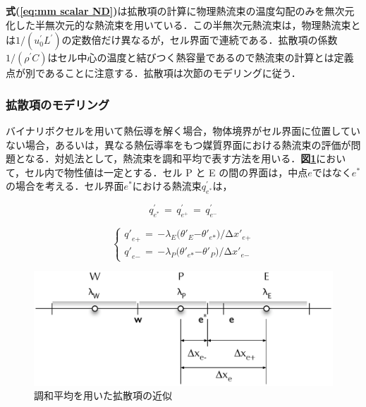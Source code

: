 \textbf{式(\ref{eq:mm scalar ND})}は拡散項の計算に物理熱流束の温度勾配のみを無次元化した半無次元的な熱流束を用いている．この半無次元熱流束は，物理熱流束とは$1/(u_{0}^{\prime}L^{\prime})$の定数倍だけ異なるが，セル界面で連続である．拡散項の係数$1/({\rho}^{\prime}C)$はセル中心の温度と結びつく熱容量であるので熱流束の計算とは定義点が別であることに注意する．拡散項は次節のモデリングに従う．

%
\subsubsection{拡散項のモデリング}
バイナリボクセルを用いて熱伝導を解く場合，物体境界がセル界面に位置していない場合，あるいは，異なる熱伝導率をもつ媒質界面における熱流束の評価が問題となる．対処法として，熱流束を調和平均で表す方法を用いる\cite{pat:80}．\textbf{図\ref{fig:diffusive flux}}において，セル内で物性値は一定とする．セル P と E の間の界面は，中点$e$ではなく$e^*$の場合を考える．セル界面$e^*$における熱流束$q^{\prime}_{e^*}$は，

\begin{equation}
q_{e^{*}}^{\prime} \,=\, q_{e^{+}}^{\prime} \,=\, q_{e^{-}}^{\prime} 
\label{difuusive flux at interface:1}
\end{equation}

\begin{equation}
\left\{{\begin{array}{l}
{{{q}'}_{{e}\mathrm{{+}}}\,=\,\mathrm{{-}}{{\mathit{\lambda}}_{E}}{\mathrm{(}}{{\mathit{\theta}}'}_{E}\mathrm{{-}}{{\mathit{\theta}}'}_{e\mathrm{*}}{\mathrm{)/}}\mathrm{\Delta}{{x}'}_{{e}\mathrm{{+}}}}\\
{{{q}'}_{{e}\mathrm{{-}}}\,=\,\mathrm{{-}}{{\mathit{\lambda}}_{P}}{\mathrm{(}}{{\mathit{\theta}}'}_{e\mathrm{*}}\mathrm{{-}}{{\mathit{\theta}}'}_{P}{\mathrm{)/}}\mathrm{\Delta}{{x}'}_{{e}\mathrm{{-}}}}\end{array}}\right.
\label{eq:difuusive flux at interface:2}
\end{equation}

\begin{figure}[htdp]
\begin{center}
\includegraphics[width=12cm,clip]{face.eps}
\caption{調和平均を用いた拡散項の近似}
\label{fig:diffusive flux}
\end{center}
\end{figure}



